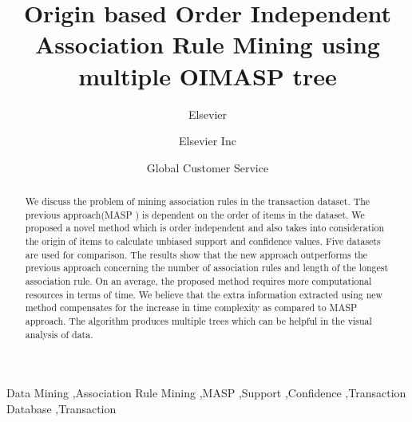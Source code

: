 \documentclass[preprint]{elsarticle}
\begin{document}
\begin{frontmatter}

\title{Origin based Order Independent Association Rule Mining using multiple OIMASP tree}

\author{Elsevier}
\address{Radarweg 29, Amsterdam}

\author[mymainaddress,mysecondaryaddress]{Elsevier Inc}

\author[mysecondaryaddress]{Global Customer Service}

\address[mymainaddress]{1600 John F Kennedy Boulevard, Philadelphia}
\address[mysecondaryaddress]{360 Park Avenue South, New York}

\begin{abstract}
We discuss the problem of mining association rules in the transaction dataset. The previous approach(MASP \cite{oldmasp}) is dependent on the order of items in the dataset. We proposed a novel method which is order independent and also takes into consideration the origin of items to calculate unbiased support and confidence values. Five datasets are used for comparison. The results show that the new approach outperforms the previous approach concerning the number of association rules and length of the longest association rule. On an average, the proposed method requires more computational resources in terms of time. We believe that the extra information extracted using new method compensates for the increase in time complexity as compared to MASP approach. The algorithm produces multiple trees which can be helpful in the visual analysis of data.
\end{abstract}

\begin{keyword}
Data Mining \sep Association Rule Mining \sep MASP \sep Support 
\sep Confidence \sep Transaction Database \sep Transaction
\end{keyword}

\end{frontmatter}
\end{document}

